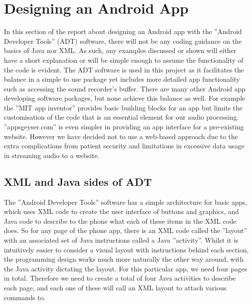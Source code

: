 \section{Designing an Android App}
\label{sec:android-george}
In this section of the report about designing an Android app with the ''Android Developer Tools'' (ADT) software, there will not be any coding guidance on the basics of Java nor XML. As such, any examples discussed or shown will either have a short explanation or will be simple enough to assume the functionality of the code is evident. The ADT software is used in this project as it facilitates the balance in a simple to use package yet includes more detailed app functionality such as accessing the sound recorder’s buffer. There are many other Android app developing software packages, but none achieve this balance as well. For example the ''MIT app inventor'' provides basic building blocks for an app but limits the customisation of the code that is an essential element for our audio processing. ''appsgeyser.com'' is even simpler in providing an app interface for a pre-existing website. However we have decided not to use a web-based approach due to the extra complications from patient security and limitations in excessive data usage in streaming audio to a website.
\subsection{XML and Java sides of ADT}
The ''Android Developer Tools'' software has a simple architecture for basic apps, which uses XML code to create the user interface of buttons and graphics, and Java code to describe to the phone what each of these items in the XML code does. So for any page of the phone app, there is an XML code called the ''layout'' with an associated set of Java instructions called a Java ''activity''. Whilst it is intuitively easier to consider a visual layout with instructions behind each section, the programming design works much more naturally the other way around, with the Java activity dictating the layout. For this particular app, we need four pages in total. Therefore we need to create a total of four Java activities to describe each page, and each one of these will call an XML layout to attach various commands to.
